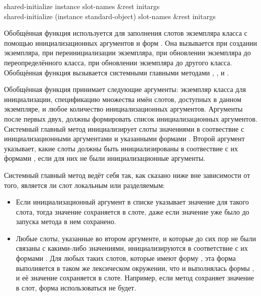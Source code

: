 \begin{defun}
shared-initialize instance slot-names &rest initargs \\
shared-initialize (instance standard-object) slot-names &rest initargs

Обобщённая функция  используется для заполнения слотов
экземпляра класса с помощью инициализационных аргументов и форм
. Она вызывается при создании экземпляра, при переинициализации
экземпляра, при обновлении экземпляра до переопределённого класса, при
обновлении экземпляра до другого класса. Обобщённая функция
 вызывается системными главными методами
, ,
 и
.

Обобщённая функция  принимает следующие аргументы:
экземпляр класса для инициализации, спецификацию множества имён слотов,
доступных в данном экземпляре, и любое количество инициализационных
аргументов. Аргументы после первых двух, должны формировать список
инициализационных аргументов. Системный главный метод 
инициализирует слоты значениями в соотвествие с инициализационными аргументами и
указанными формами . Второй аргумент указывает, какие слоты должны
быть инициализированы в соотвествие с их формами , если для них не
были инициализационные аргументы.

Системный главный метод ведёт себя так, как сказано ниже вне зависимости от
того, является ли слот локальным или разделяемым:

\begin{itemize}

\item Если инициализационный аргумент в списке указывает значение для такого
  слота, тогда значение сохраняется в слоте, даже если значение уже было до
  запуска метода в нем сохранено.

\item Любые слоты, указанные во втором аргументе, и которые до сих пор не были связаны
с какими-либо значениями, инициализируются в соответствие с их формами
. Для любых таких слотов, которые имеют форму ,
эта форма выполняется в таком же лексическом окружении, что и выполнялась формы
, и её значение сохраняется в слоте. Например, если 
метод сохраняет значение в слот, форма  использоваться не будет.


\end{itemize}
\end{defun}
